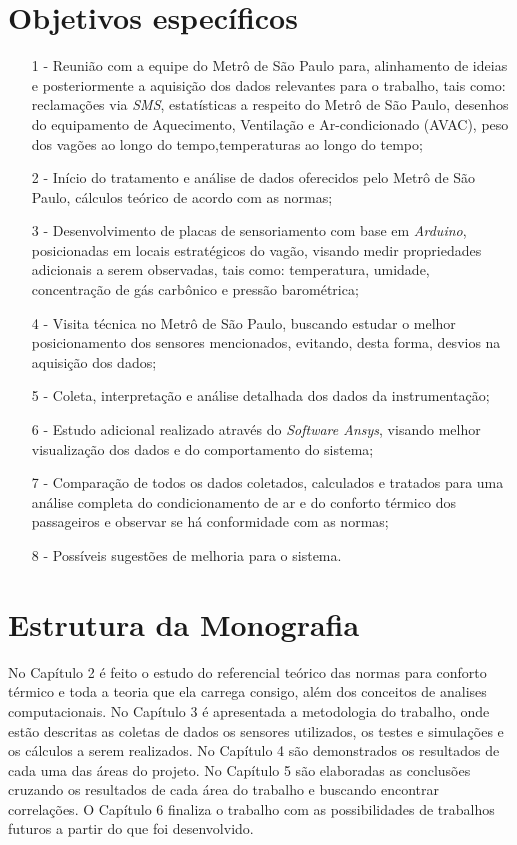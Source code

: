 \documentclass[acronym,symbols,table]{fei}
\begin{document}
\section{Objetivos específicos}

\begin{itemize}
    \item[1 -]Reunião com a equipe do Metrô de São Paulo para, alinhamento de ideias e posteriormente a  aquisição dos dados relevantes para o trabalho, tais como: reclamações via \textit{SMS}, estatísticas a respeito do Metrô de São Paulo, desenhos do equipamento de Aquecimento, Ventilação e Ar-condicionado (AVAC), peso dos vagões ao longo do tempo,temperaturas ao longo do tempo;
    \item[2 -]Início do tratamento e análise de dados oferecidos pelo Metrô de São Paulo, cálculos teórico de acordo com as normas;
    \item[3 -]Desenvolvimento de placas de sensoriamento com base em \textit{Arduino}, posicionadas em locais estratégicos do vagão, visando medir propriedades adicionais a serem observadas, tais como: temperatura, umidade, concentração de gás carbônico e pressão barométrica;
    \item[4 -]Visita técnica no Metrô de São Paulo, buscando estudar o melhor posicionamento dos sensores mencionados, evitando, desta forma, desvios na aquisição dos dados;
    \item[5 -]Coleta, interpretação e análise detalhada dos dados da instrumentação;
    \item[6 -]Estudo adicional realizado através do \textit{Software Ansys}, visando melhor visualização dos dados e do comportamento do sistema;
    \item[7 -]Comparação de todos os dados coletados, calculados e tratados para uma análise completa do condicionamento de ar e do conforto térmico dos passageiros e observar se há conformidade com as normas;
    \item[8 -]Possíveis sugestões de melhoria para o sistema.
\end{itemize}

\section{Estrutura da Monografia} %

No Capítulo 2 é feito o estudo do referencial teórico das normas para conforto térmico e toda a teoria que ela carrega consigo, além dos conceitos de analises computacionais. No Capítulo 3 é apresentada a metodologia do trabalho, onde estão descritas as coletas de dados os sensores utilizados, os testes e simulações e os cálculos a serem realizados. No Capítulo 4 são demonstrados os resultados de cada uma das áreas do projeto. No Capítulo 5 são elaboradas as conclusões cruzando os resultados de cada área do trabalho e buscando encontrar correlações. O Capítulo 6 finaliza o trabalho com as possibilidades de trabalhos futuros a partir do que foi desenvolvido.
\end{document}
